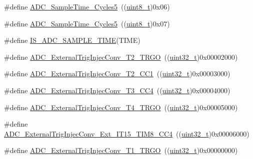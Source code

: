 \begin{DoxyCompactItemize}
\item 
\#define \hyperlink{group___a_d_c__sampling__time_gae46e8978ac3160969156739ddb867dae}{A\+D\+C\+\_\+\+Sample\+Time\+\_\+Cycles5}~((\hyperlink{_p_e___types_8h_aba7bc1797add20fe3efdf37ced1182c5}{uint8\+\_\+t})0x06)
\item 
\#define \hyperlink{group___a_d_c__sampling__time_ga93117dc4090dc4e3e84e0eef6d6ab073}{A\+D\+C\+\_\+\+Sample\+Time\+\_\+Cycles5}~((\hyperlink{_p_e___types_8h_aba7bc1797add20fe3efdf37ced1182c5}{uint8\+\_\+t})0x07)
\item 
\#define \hyperlink{group___a_d_c__sampling__time_ga30e0307fa009e1c383d3047b48e94644}{I\+S\+\_\+\+A\+D\+C\+\_\+\+S\+A\+M\+P\+L\+E\+\_\+\+T\+I\+ME}(T\+I\+ME)
\item 
\#define \hyperlink{group___a_d_c__external__trigger__sources__for__injected__channels__conversion_gaaad112b2b035dfd77c9743197c51b16f}{A\+D\+C\+\_\+\+External\+Trig\+Injec\+Conv\+\_\+\+T2\+\_\+\+T\+R\+GO}~((\hyperlink{_p_e___types_8h_a33594304e786b158f3fb30289278f5af}{uint32\+\_\+t})0x00002000)
\item 
\#define \hyperlink{group___a_d_c__external__trigger__sources__for__injected__channels__conversion_ga49089501c5bf2a2c22019fbca4b688e9}{A\+D\+C\+\_\+\+External\+Trig\+Injec\+Conv\+\_\+\+T2\+\_\+\+C\+C1}~((\hyperlink{_p_e___types_8h_a33594304e786b158f3fb30289278f5af}{uint32\+\_\+t})0x00003000)
\item 
\#define \hyperlink{group___a_d_c__external__trigger__sources__for__injected__channels__conversion_ga6c9ddf9bba0cefe77dbcd601aed24f7b}{A\+D\+C\+\_\+\+External\+Trig\+Injec\+Conv\+\_\+\+T3\+\_\+\+C\+C4}~((\hyperlink{_p_e___types_8h_a33594304e786b158f3fb30289278f5af}{uint32\+\_\+t})0x00004000)
\item 
\#define \hyperlink{group___a_d_c__external__trigger__sources__for__injected__channels__conversion_gab12e5503085cdb9dde4a59614e421284}{A\+D\+C\+\_\+\+External\+Trig\+Injec\+Conv\+\_\+\+T4\+\_\+\+T\+R\+GO}~((\hyperlink{_p_e___types_8h_a33594304e786b158f3fb30289278f5af}{uint32\+\_\+t})0x00005000)
\item 
\#define \hyperlink{group___a_d_c__external__trigger__sources__for__injected__channels__conversion_gaa23965b742e08142e5d1c453166dbcc2}{A\+D\+C\+\_\+\+External\+Trig\+Injec\+Conv\+\_\+\+Ext\+\_\+\+I\+T15\+\_\+\+T\+I\+M8\+\_\+\+C\+C4}~((\hyperlink{_p_e___types_8h_a33594304e786b158f3fb30289278f5af}{uint32\+\_\+t})0x00006000)
\item 
\#define \hyperlink{group___a_d_c__external__trigger__sources__for__injected__channels__conversion_gabf47f66e60c166f6b63b805f72ad94b0}{A\+D\+C\+\_\+\+External\+Trig\+Injec\+Conv\+\_\+\+T1\+\_\+\+T\+R\+GO}~((\hyperlink{_p_e___types_8h_a33594304e786b158f3fb30289278f5af}{uint32\+\_\+t})0x00000000)

\end{DoxyCompactItemize}
